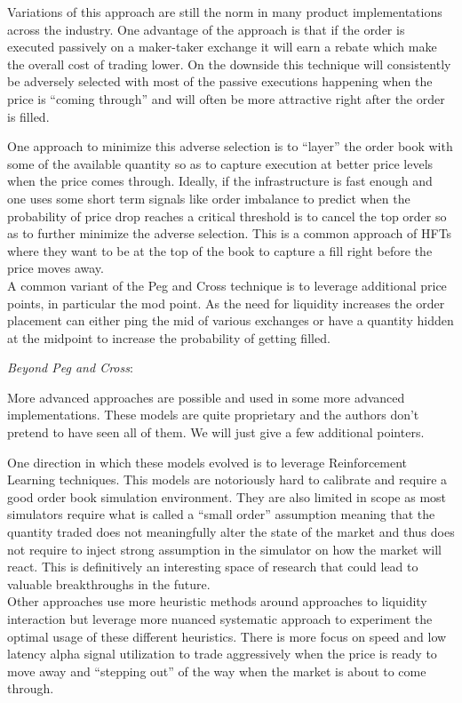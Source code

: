 Variations of this approach are still the norm in many product implementations across the industry. One advantage of the approach is that if  the order is executed passively on a maker-taker exchange it will earn a rebate which make the overall cost of trading lower. On the downside this technique will consistently be adversely selected with most of the passive executions happening when the price is ``coming through'' and will often be more attractive right after the order is filled.

One approach to minimize this adverse selection is to ``layer'' the order book with some of the available quantity so as to capture execution at better price levels when the price comes through. Ideally, if the infrastructure is fast enough and one uses some short term signals like order imbalance to predict when the probability of price drop reaches a critical threshold is to cancel the top order so as to further minimize the adverse selection. This is a common approach of HFTs where they want to be at the top of the book to capture a fill right before the price moves away.\\

A common variant of the Peg and Cross technique is to leverage additional price points, in particular the mod point. As the need for liquidity increases the order placement can either ping the mid of various exchanges or have a quantity hidden at the midpoint to increase the probability of getting filled. 

\noindent\emph{Beyond Peg and Cross}: 

More advanced approaches are possible and used in some more advanced implementations. These models are quite proprietary and the authors don't pretend to have seen all of them. We will just give a few additional pointers.

One direction in which these models evolved is to leverage Reinforcement Learning techniques. This models are notoriously hard to calibrate and require a good order book simulation environment. They are also limited in scope as most simulators require what is called a ``small order'' assumption meaning that the quantity traded does not meaningfully alter the state of the market and thus does not require to inject strong assumption in the simulator on how the market will react. This is definitively an interesting space of research that could lead to valuable breakthroughs in the future.\\

Other approaches use more heuristic methods around approaches to liquidity interaction but leverage more nuanced systematic approach to experiment the optimal usage of these different heuristics. There is more focus on speed and low latency alpha  signal utilization to trade aggressively when the price is ready to move away and ``stepping out'' of the way when the market is about to come through.

